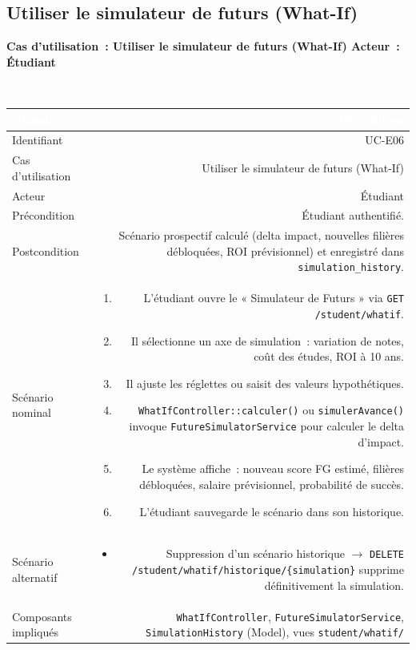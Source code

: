 \documentclass[a4paper,12pt]{article}
\newcommand{\ucheader}[2]{%
  \noindent\colorbox{capblue}{\parbox{\dimexpr\linewidth-2\fboxsep}{%
    \color{white}\bfseries\large Cas d'utilisation~: #1 \hfill \normalsize Acteur~: #2
  }}\\[2pt]
}
\begin{document}
\vspace{1em}

\subsection{Utiliser le simulateur de futurs (What-If)}
\ucheader{Utiliser le simulateur de futurs (What-If)}{Étudiant}

\noindent
\begin{tabular}{|L|R|}
\hline
{}\textcolor{white}{\textbf{Champ}} & \textcolor{white}{\textbf{Description}} \\
\hline
{}Identifiant & UC-E06 \\
\hline
Cas d'utilisation & Utiliser le simulateur de futurs (What-If) \\
\hline
{}Acteur & Étudiant \\
\hline
Précondition & Étudiant authentifié. \\
\hline
{}Postcondition & Scénario prospectif calculé (delta impact, nouvelles filières débloquées, ROI prévisionnel) et enregistré dans \texttt{simulation\_history}. \\
\hline
Scénario nominal &
\begin{enumerate}
  \item L'étudiant ouvre le « Simulateur de Futurs » via \texttt{GET /student/whatif}.
  \item Il sélectionne un axe de simulation~: variation de notes, coût des études, ROI à 10 ans.
  \item Il ajuste les réglettes ou saisit des valeurs hypothétiques.
  \item \texttt{WhatIfController::calculer()} ou \texttt{simulerAvance()} invoque \texttt{FutureSimulatorService} pour calculer le delta d'impact.
  \item Le système affiche~: nouveau score FG estimé, filières débloquées, salaire prévisionnel, probabilité de succès.
  \item L'étudiant sauvegarde le scénario dans son historique.
\end{enumerate} \\
\hline
{}Scénario alternatif &
\begin{itemize}
  \item Suppression d'un scénario historique $\rightarrow$ \texttt{DELETE /student/whatif/historique/\{simulation\}} supprime définitivement la simulation.
\end{itemize} \\
\hline
Composants impliqués & \texttt{WhatIfController}, \texttt{FutureSimulatorService}, \texttt{SimulationHistory} (Model), vues \texttt{student/whatif/} \\
\hline
\end{tabular}
\end{document}

